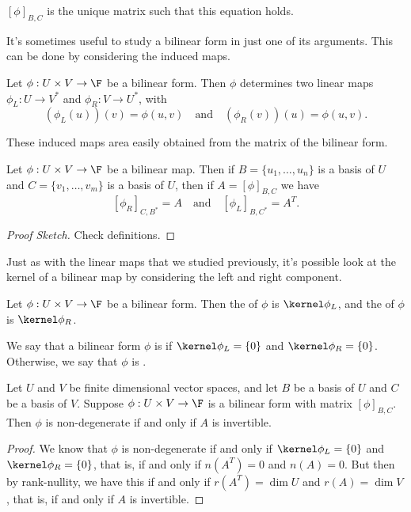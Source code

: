 \documentclass[a4paper]{scrartcl}
\begin{document}
\begin{remark}
    $[\phi]_{B, C}$ is the unique matrix such that this equation holds.
\end{remark}

It's sometimes useful to study a bilinear form in just one of its arguments. This can be done by considering the induced maps.

\begin{definition}    
    Let $\phi: U \times V \rightarrow \F$ be a bilinear form. Then $\phi$ determines two linear maps $\phi_L: U \rightarrow V^*$ and $\phi_R: V\rightarrow U^*$, with
    $$
    (\phi_L(u))(v) = \phi(u, v) \quad \text{and} \quad (\phi_R(v))(u) = \phi(u, v).
    $$
\end{definition}

These induced maps area easily obtained from the matrix of the bilinear form.

\begin{lemma}
    Let $\phi: U \times V \rightarrow \F$ be a bilinear map.
    Then if $B = \{u_1, \dots, u_n\}$ is a basis of $U$ and $C = \{v_1, \dots, v_m\}$ is a basis of $U$, then if $A = [\phi]_{B, C}$ we have
    $$
    [\phi_R]_{C, B^*} = A \quad \text{and} \quad [\phi_L]_{B, C^*} = A^T.
    $$
\end{lemma}
\begin{proof}[Proof Sketch]
    Check definitions.
\end{proof}

Just as with the linear maps that we studied previously, it's possible look at the kernel of a bilinear map by considering the left and right component.

\begin{definition}
    Let $\phi: U \times V \rightarrow \F$ be a bilinear form. Then the  of $\phi$ is $\kernel \phi_L$, and the  of $\phi$ is $\kernel \phi_R$.
\end{definition}

\begin{definition}[Degeneracy]
    We say that a bilinear form $\phi$ is  if $\kernel \phi_L = \{0\}$ and $\kernel \phi_R = \{0\}$. Otherwise, we say that $\phi$ is . 
\end{definition}

\begin{lemma}
    Let $U$ and $V$ be finite dimensional vector spaces, and 
let $B$ be a basis of $U$ and $C$ be a basis of $V$. 
Suppose $\phi: U \times V \rightarrow \F$ is a bilinear form with matrix $[\phi]_{B, C}$. Then $\phi$ is non-degenerate if and only if $A$ is invertible.
\end{lemma}
\begin{proof}
    We know that $\phi$ is non-degenerate if and only if $\kernel \phi_L = \{0\}$ and $\kernel \phi_R = \{0\}$, that is, if and only if $n(A^T) = 0$ and $n(A) = 0$. But then by rank-nullity, we have this if and only if $r(A^T) = \dim U$ and $r(A) = \dim V$, that is, if and only if $A$ is invertible.
\end{proof}
\end{document}
